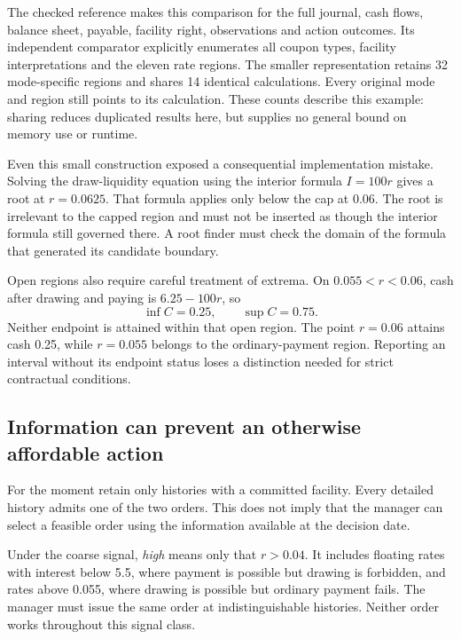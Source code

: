 The checked reference makes this comparison for the full journal, cash flows, balance sheet, payable, facility right, observations and action outcomes. Its independent comparator explicitly enumerates all coupon types, facility interpretations and the eleven rate regions. The smaller representation retains 32 mode-specific regions and shares 14 identical calculations. Every original mode and region still points to its calculation. These counts describe this example: sharing reduces duplicated results here, but supplies no general bound on memory use or runtime.

Even this small construction exposed a consequential implementation mistake. Solving the draw-liquidity equation using the interior formula $I=100r$ gives a root at $r=0.0625$. That formula applies only below the cap at 0.06. The root is irrelevant to the capped region and must not be inserted as though the interior formula still governed there. A root finder must check the domain of the formula that generated its candidate boundary.

Open regions also require careful treatment of extrema. On $0.055<r<0.06$, cash after drawing and paying is $6.25-100r$, so
\begin{equation}
 \inf C=0.25,\qquad \sup C=0.75.
\end{equation}
Neither endpoint is attained within that open region. The point $r=0.06$ attains cash 0.25, while $r=0.055$ belongs to the ordinary-payment region. Reporting an interval without its endpoint status loses a distinction needed for strict contractual conditions.

\subsection{Information can prevent an otherwise affordable action}

For the moment retain only histories with a committed facility. Every detailed history admits one of the two orders. This does not imply that the manager can select a feasible order using the information available at the decision date.

Under the coarse signal, \emph{high} means only that $r>0.04$. It includes floating rates with interest below 5.5, where payment is possible but drawing is forbidden, and rates above 0.055, where drawing is possible but ordinary payment fails. The manager must issue the same order at indistinguishable histories. Neither order works throughout this signal class.

